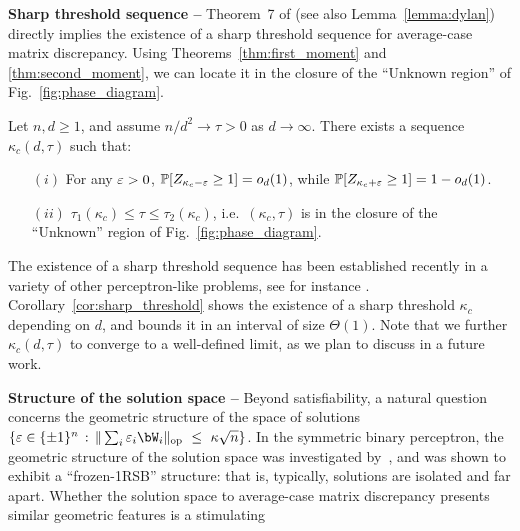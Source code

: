 \myskip 
\textbf{Sharp threshold sequence --}
Theorem~7 of \cite{altschuler2023zero} (see also Lemma~\ref{lemma:dylan})
directly implies the existence of a sharp threshold sequence for average-case matrix discrepancy. 
Using Theorems~\ref{thm:first_moment} and \ref{thm:second_moment}, we can locate it
in the closure of the ``Unknown region'' of Fig.~\ref{fig:phase_diagram}.
\begin{corollary}\label{cor:sharp_threshold}
    \noindent
    Let $n, d \geq 1$, and assume $n/d^2 \to \tau > 0$ as $d\to \infty$. There exists a sequence 
    $\kappa_c(d,\tau)$ such that: 
    \begin{itemize}
        \item[$(i)$] For any $\varepsilon > 0$, $\mathbb{P}[Z_{\kappa_c - \varepsilon} \geq 1] = o_d(1)$, while $\mathbb{P}[Z_{\kappa_c + \varepsilon} \geq 1] = 1 - o_d(1)$.
        \item[$(ii)$]  $\tau_1(\kappa_c) \leq \tau \leq \tau_2(\kappa_c)$, i.e.\ $(\kappa_c,\tau)$ is in the closure of the ``Unknown'' region of Fig.~\ref{fig:phase_diagram}.
    \end{itemize}
\end{corollary}
\noindent
The existence of a sharp threshold sequence has been established recently in a variety of other perceptron-like problems, see for instance \cite{talagrand1999self,talagrand2011mean,xu2021sharp,nakajima2023sharp,altschuler2023zero}.
Corollary~\ref{cor:sharp_threshold} shows the existence of a sharp threshold $\kappa_c$ depending on $d$, and bounds it in an interval of size $\Theta(1)$. Note that we further  $\kappa_c(d,\tau)$ to converge to a well-defined limit, as we plan to discuss in a future work.

\myskip
\textbf{Structure of the solution space --}
Beyond satisfiability, a natural question
concerns
the geometric structure 
of the space of solutions $\{\eps \in \{\pm 1\}^n \, : \, \|\sum_i \eps_i \bW_i\|_\op~\leq~\kappa \sqrt{n}\}$.
In the symmetric binary perceptron, the geometric structure of the solution space was investigated by~\cite{aubin2019storage,perkins2021frozen,abbe2022proof},
and was shown to exhibit a ``frozen-1RSB'' structure: that is, typically, solutions are isolated and far apart.
Whether the solution space to average-case matrix discrepancy presents similar geometric features is a stimulating 

